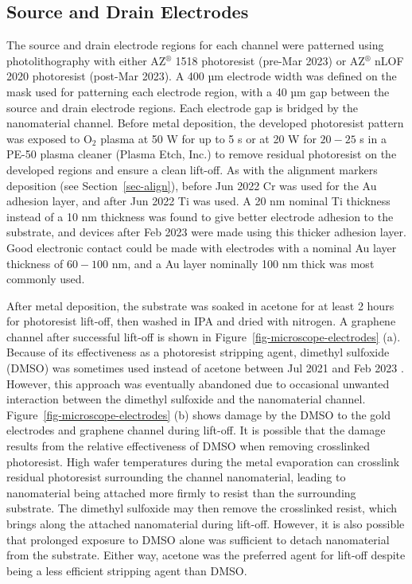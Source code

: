 \documentclass[
  a4paper,
]{scrbook}
\begin{document}
\hypertarget{sec-electrodes}{%
\subsection{Source and Drain Electrodes}\label{sec-electrodes}}

The source and drain electrode regions for each channel were patterned
using photolithography with either AZ\(^\circledR\) 1518 photoresist
(pre-Mar 2023) or AZ\(^\circledR\) nLOF 2020 photoresist (post-Mar
2023). A 400 µm electrode width was defined on the mask used for
patterning each electrode region, with a 40 µm gap between the source
and drain electrode regions. Each electrode gap is bridged by the
nanomaterial channel. Before metal deposition, the developed photoresist
pattern was exposed to O\(_2\) plasma at 50 W for up to 5 s or at 20 W
for \(20-25\) s in a PE-50 plasma cleaner (Plasma Etch, Inc.) to remove
residual photoresist on the developed regions and ensure a clean
lift-off. As with the alignment markers deposition (see
Section~\ref{sec-align}), before Jun 2022 Cr was used for the Au
adhesion layer, and after Jun 2022 Ti was used. A 20 nm nominal Ti
thickness instead of a 10 nm thickness was found to give better
electrode adhesion to the substrate, and devices after Feb 2023 were
made using this thicker adhesion layer. Good electronic contact could be
made with electrodes with a nominal Au layer thickness of \(60-100\) nm,
and a Au layer nominally 100 nm thick was most commonly used.

After metal deposition, the substrate was soaked in acetone for at least
2 hours for photoresist lift-off, then washed in IPA and dried with
nitrogen. A graphene channel after successful lift-off is shown in
Figure~\ref{fig-microscope-electrodes} (a). Because of its effectiveness
as a photoresist stripping agent, dimethyl sulfoxide (DMSO) was
sometimes used instead of acetone between Jul 2021 and Feb 2023
\autocite{Microchemicals2}. However, this approach was eventually
abandoned due to occasional unwanted interaction between the dimethyl
sulfoxide and the nanomaterial channel.
Figure~\ref{fig-microscope-electrodes} (b) shows damage by the DMSO to
the gold electrodes and graphene channel during lift-off. It is possible
that the damage results from the relative effectiveness of DMSO when
removing crosslinked photoresist. High wafer temperatures during the
metal evaporation can crosslink residual photoresist surrounding the
channel nanomaterial, leading to nanomaterial being attached more firmly
to resist than the surrounding substrate. The dimethyl sulfoxide may
then remove the crosslinked resist, which brings along the attached
nanomaterial during lift-off. However, it is also possible that
prolonged exposure to DMSO alone was sufficient to detach nanomaterial
from the substrate. Either way, acetone was the preferred agent for
lift-off despite being a less efficient stripping agent than DMSO.
\end{document}

